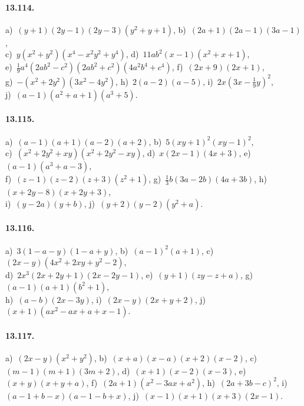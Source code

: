 \paragraph{13.114.}
a)~$(y+1)(2y-1)(2y-3)\left(y^{2}+y+1\right)$,\quad 
b)~$(2a+1)(2a-1)(3a-1)$,\protect\\
c)~$y\left(x^{2}+y^{2}\right)\left(x^{4}-x^{2}y^{2}+y^{4}\right)$,\quad 
d)~$11ab^{2}(x-1)\left(x^{2}+x+1\right)$,\protect\\
e)~$\frac{1}{9}a^{4}\left(2ab^{2}-c^{2}\right)\left(2ab^{2}+c^{2}\right)\left(4a^{2}b^{4}+c^{4}\right)$,\quad 
f)~$(2x+9)(2x+1)$,\protect\\
g)~$-\left(x^{2}+2y^{2}\right)\left(3x^{2}-4y^{2}\right)$,\quad 
h)~$2(a-2)(a-5)$,\quad 
i)~$2x\left(3x-\frac{1}{9}y\right)^{2}$,\protect\\
j)~$(a-1)\left(a^{2}+a+1\right)\left(a^{3}+5\right)$.

\paragraph{13.115.}
a)~$(a-1)(a+1)(a-2)(a+2)$,\quad 
b)~$5(xy+1)^{2}(xy-1)^{2}$,\protect\\ 
c)~$\left(x^{2}+2y^{2}+xy\right)\left(x^{2}+2y^{2}-xy\right)$,\quad 
d)~$x(2x-1)(4x+3)$,\quad 
e)~$(a-1)\left(a^{3}+a-3\right)$,\protect\\
f)~$(z-1)(z-2)(z+3)\left(z^{2}+1\right)$,\quad 
g)~$\frac{1}{3}b(3a-2b)(4a+3b)$,\quad 
h)~$(x+2y-8)(x+2y+3)$,\protect\\
i)~$(y-2a)(y+b)$,\quad 
j)~$(y+2)(y-2)\left(y^{2}+a\right)$.

\paragraph{13.116.}
a)~$3(1-a-y)(1-a+y)$,\quad 
b)~$(a-1)^{2}(a+1)$,\quad 
c)~$(2x-y)\left(4x^{2}+2xy+y^{2}-2\right)$,\protect\\
d)~$2x^{3}(2x+2y+1)(2x-2y-1)$,\quad 
e)~$(y+1)(zy-z+a)$,\quad 
g)~$(a-1)(a+1)\left(b^{2}+1\right)$,\protect\\
h)~$(a-b)(2x-3y)$,\quad
i)~$(2x-y)(2x+y+2)$,\quad 
j)~$(x+1)\left(ax^{2}-ax+a+x-1\right)$.

\paragraph{13.117.}
a)~$(2x-y)\left(x^{2}+y^{2}\right)$,\quad 
b)~$(x+a)(x-a)(x+2)(x-2)$,\quad 
c)~$(m-1)(m+1)(3m+2)$,\quad 
d)~$(x+1)(x-2)(x-3)$,\quad 
e)~$(x+y)(x+y+a)$,\quad 
f)~$(2a+1)\left(x^{2}-3ax+a^{2}\right)$,\quad 
h)~$(2a+3b-c)^{2}$,\quad 
i)~$(a-1+b-x)(a-1-b+x)$,\quad 
j)~$(x-1)(x+1)(x+3)(2x-1)$.

